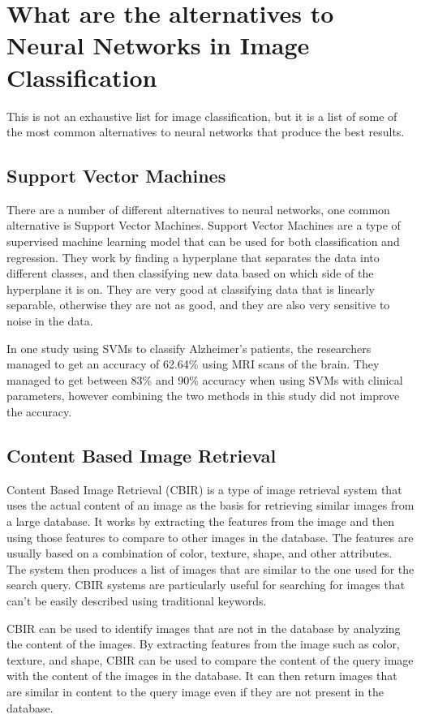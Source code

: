 \documentclass[]{final_report}
\begin{document}
\pagebreak
\section{What are the alternatives to Neural Networks in Image Classification}

This is not an exhaustive list for image classification, but it is a list of some of the most common alternatives to neural networks
that produce the best results.

\subsection{Support Vector Machines}
There are a number of different alternatives to neural networks, one common alternative is Support Vector Machines.
Support Vector Machines are a type of supervised machine learning model that can be used for both classification and regression.
They work by finding a hyperplane that separates the data into different classes, and then classifying new data based on which side of the hyperplane it is on.
They are very good at classifying data that is linearly separable, otherwise they are not as good,
and they are also very sensitive to noise in the data.

In one study using SVMs to classify Alzheimer's patients, the researchers managed to get an accuracy of 62.64\% using MRI scans of the brain.
They managed to get between 83\% and 90\% accuracy when using SVMs with clinical parameters, however combining the two methods in this study did not improve the accuracy. \cite{10.3389/fneur.2021.640696}

\subsection{Content Based Image Retrieval}
Content Based Image Retrieval (CBIR) is a type of image retrieval system that uses the actual content of an image as the basis for retrieving similar 
images from a large database. It works by extracting the features from the image and then using those features to compare to other images in the database.
The features are usually based on a combination of color, texture, shape, and other attributes. The system then produces a list of images that are similar 
to the one used for the search query. CBIR systems are particularly useful for searching for images that can't be easily described using traditional keywords.

CBIR can be used to identify images that are not in the database by analyzing the content of the images. 
By extracting features from the image such as color, texture, and shape, CBIR can be used to compare the 
content of the query image with the content of the images in the database. It can then return images that are 
similar in content to the query image even if they are not present in the database. 
\end{document}

